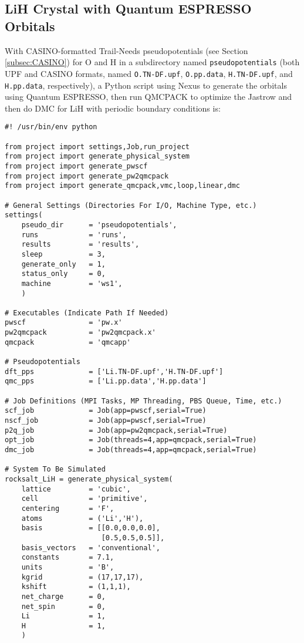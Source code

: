 \subsection{LiH Crystal with Quantum ESPRESSO Orbitals}
With CASINO-formatted Trail-Needs pseudopotentials (see Section \ref{subsec:CASINO}) for O and H in a subdirectory named \texttt{pseudopotentials} (both UPF and CASINO  formats, named \texttt{O.TN-DF.upf}, \texttt{O.pp.data}, \texttt{H.TN-DF.upf}, and \texttt{H.pp.data}, respectively), a Python script using Nexus to generate the orbitals using Quantum ESPRESSO, then run QMCPACK to optimize the Jastrow and then do DMC for LiH with periodic boundary conditions is:
\begin{lstlisting}[caption=Nexus example for bulk LiH using Quantum ESPRESSO orbitals and CASINO pseudopotentials]
#! /usr/bin/env python

from project import settings,Job,run_project
from project import generate_physical_system
from project import generate_pwscf
from project import generate_pw2qmcpack
from project import generate_qmcpack,vmc,loop,linear,dmc

# General Settings (Directories For I/O, Machine Type, etc.)
settings(
    pseudo_dir      = 'pseudopotentials',
    runs            = 'runs',
    results         = 'results',
    sleep           = 3,
    generate_only   = 1,
    status_only     = 0,
    machine         = 'ws1',
    )

# Executables (Indicate Path If Needed)
pwscf               = 'pw.x'
pw2qmcpack          = 'pw2qmcpack.x'
qmcpack             = 'qmcapp'

# Pseudopotentials
dft_pps             = ['Li.TN-DF.upf','H.TN-DF.upf']
qmc_pps             = ['Li.pp.data','H.pp.data']

# Job Definitions (MPI Tasks, MP Threading, PBS Queue, Time, etc.)
scf_job             = Job(app=pwscf,serial=True)
nscf_job            = Job(app=pwscf,serial=True)
p2q_job             = Job(app=pw2qmcpack,serial=True)
opt_job             = Job(threads=4,app=qmcpack,serial=True)
dmc_job             = Job(threads=4,app=qmcpack,serial=True)

# System To Be Simulated
rocksalt_LiH = generate_physical_system(
    lattice         = 'cubic',
    cell            = 'primitive',
    centering       = 'F',
    atoms           = ('Li','H'),
    basis           = [[0.0,0.0,0.0],
                       [0.5,0.5,0.5]],
    basis_vectors   = 'conventional',
    constants       = 7.1,
    units           = 'B',
    kgrid           = (17,17,17),
    kshift          = (1,1,1),
    net_charge      = 0,
    net_spin        = 0,
    Li              = 1,
    H               = 1,
    )


\end{lstlisting}
